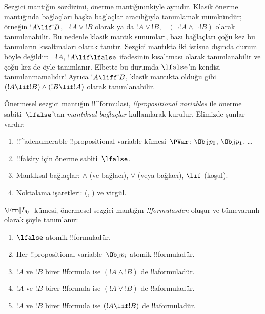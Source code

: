



Sezgici mantığın sözdizimi, önerme mantığınınkiyle aynıdır. Klasik önerme
mantığında bağlaçları başka bağlaçlar aracılığıyla tanımlamak mümkündür;
örneğin $!A \lif !B$, $\lnot !A \lor !B$ olarak ya da $!A \lor !B$,
$\lnot(\lnot !A \land \lnot !B)$ olarak tanımlanabilir. Bu nedenle klasik
mantık sunumları, bazı bağlaçları çoğu kez bu tanımların kısaltmaları olarak
tanıtır. Sezgici mantıkta iki istisna dışında durum böyle değildir: $\lnot !A$,
$!A \lif \lfalse$ ifadesinin kısaltması olarak tanımlanabilir ve çoğu kez de
öyle tanımlanır. Elbette bu durumda $\lfalse$'ın kendisi tanımlanmamalıdır!{}
Ayrıca $!A \liff !B$, klasik mantıkta olduğu gibi $(!A \lif !B) \land (!B
\lif !A)$ olarak tanımlanabilir.

Önermesel sezgici mantığın !!^{formula}s{}i, \emph{!!{propositional variable}s}
ile önerme sabiti~$\lfalse$'tan \emph{mantıksal bağlaçlar} kullanılarak
kurulur. Elimizde şunlar vardır:

\begin{enumerate}
\item !!^a{denumerable} !!{propositional variable} kümesi~$\PVar$: $\Obj p_0$,
  $\Obj p_1$, \dots
\item !!{falsity} için önerme sabiti~$\lfalse$.
\item Mantıksal bağlaçlar: $\land$ (ve bağlacı), $\lor$ (veya bağlacı),
  $\lif$ (koşul).
\item Noktalama işaretleri: (, ) ve virgül.
\end{enumerate}

\begin{defn}[Formül]
 $\Frm[L_0]$ kümesi, önermesel sezgici mantığın
\emph{!!{formula}s{}den} oluşur ve tümevarımlı olarak şöyle tanımlanır:
\begin{enumerate}
\item $\lfalse$ atomik !!{formula}{}dür.

\item Her !!{propositional variable}~$\Obj p_i$ atomik !!{formula}{}dür.

\item $!A$ ve $!B$ birer !!{formula} ise $(!A \land !B)$ de
  !!a{formula}{}dür.

\item $!A$ ve $!B$ birer !!{formula} ise $(!A \lor !B)$ de
  !!a{formula}{}dür.

\item $!A$ ve $!B$ birer !!{formula} ise $(!A \lif !B)$ de
  !!a{formula}{}dür.

\end{enumerate}
\end{defn}

